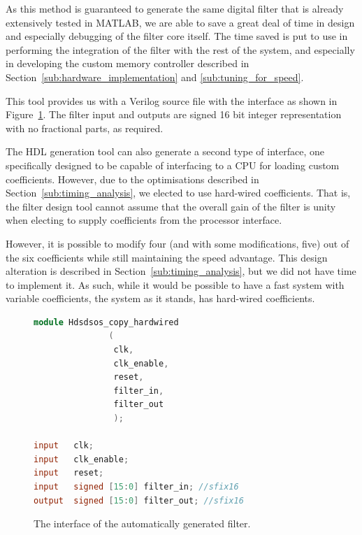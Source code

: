 \documentclass[]{article}
\begin{document}
As this method is guaranteed to generate the same digital filter that is already extensively tested in MATLAB, we are able to save a great deal of time in design and especially debugging of the filter core itself.
The time saved is put to use in performing the integration of the filter with the rest of the system, and especially in developing the custom memory controller described in Section~\ref{sub:hardware_implementation} and \ref{sub:tuning_for_speed}.

This tool provides us with a Verilog source file with the interface as shown in Figure~\ref{fig:Hdsdsos_interface}. The filter input and outputs are signed 16 bit integer representation with no fractional parts, as required.

The HDL generation tool can also generate a second type of interface, one specifically designed to be capable of interfacing to a CPU for loading custom coefficients. However, due to the optimisations described in Section~\ref{sub:timing_analysis}, we elected to use hard-wired coefficients.
That is, the filter design tool cannot assume that the overall gain of the filter is unity when electing to supply coefficients from the processor interface.

However, it is possible to modify four (and with some modifications, five) out of the six coefficients while still maintaining the speed advantage. This design alteration is described in Section~\ref{sub:timing_analysis}, but we did not have time to implement it.
As such, while it would be possible to have a fast system with variable coefficients, the system as it stands, has hard-wired coefficients.

\begin{figure}[tbp]
	\begin{center}
		\begin{lstlisting}[language = Verilog]
module Hdsdsos_copy_hardwired
               (
                clk,
                clk_enable,
                reset,
                filter_in,
                filter_out
                );

input   clk; 
input   clk_enable; 
input   reset; 
input   signed [15:0] filter_in; //sfix16
output  signed [15:0] filter_out; //sfix16
		\end{lstlisting}
	\end{center}
	\caption{The interface of the automatically generated filter.}
	\label{fig:Hdsdsos_interface}
\end{figure}

\end{document}
